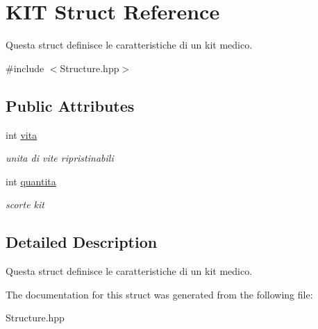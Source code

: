 \hypertarget{structKIT}{}\section{K\+I\+T Struct Reference}
\label{structKIT}


Questa struct definisce le caratteristiche di un kit medico.  




{\ttfamily \#include $<$Structure.\+hpp$>$}

\subsection*{Public Attributes}
\begin{DoxyCompactItemize}
\item 
\hypertarget{structKIT_a15f11b0384a58b6c3bc950c56651848c}{}int \hyperlink{structKIT_a15f11b0384a58b6c3bc950c56651848c}{vita}\label{structKIT_a15f11b0384a58b6c3bc950c56651848c}

\begin{DoxyCompactList}\small\item\em unita di vite ripristinabili \end{DoxyCompactList}\item 
\hypertarget{structKIT_ae1ddbb526542d92638779b1e03360ebe}{}int \hyperlink{structKIT_ae1ddbb526542d92638779b1e03360ebe}{quantita}\label{structKIT_ae1ddbb526542d92638779b1e03360ebe}

\begin{DoxyCompactList}\small\item\em scorte kit \end{DoxyCompactList}\end{DoxyCompactItemize}


\subsection{Detailed Description}
Questa struct definisce le caratteristiche di un kit medico. 

The documentation for this struct was generated from the following file\+:\begin{DoxyCompactItemize}
\item 
Structure.\+hpp\end{DoxyCompactItemize}
